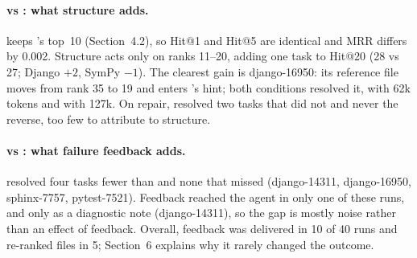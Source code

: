 \paragraph{\condB{} vs \condC: what structure adds.}
\condC{} keeps \condB's top~10 (Section~4.2), so Hit@1 and Hit@5 are identical and MRR differs by 0.002.
Structure acts only on ranks 11--20, adding one task to Hit@20 (28 vs 27; Django $+2$, SymPy $-1$). The
clearest gain is django-16950: its reference file moves from rank 35 to 19 and enters \condC's hint;
both conditions resolved it, \condC{} with 62k tokens and \condB{} with 127k. On repair, \condC{} resolved
two tasks that \condB{} did not and never the reverse, too few to attribute to structure.

\paragraph{\condC{} vs \condD: what failure feedback adds.}
\condD{} resolved four tasks fewer than \condC{} and none that \condC{} missed (django-14311,
django-16950, sphinx-7757, pytest-7521). Feedback reached the agent in only one of these runs, and only
as a diagnostic note (django-14311), so the gap is mostly noise rather than an effect of feedback.
Overall, feedback was delivered in 10 of 40 \condD{} runs and re-ranked files in 5; Section~6 explains
why it rarely changed the outcome.
